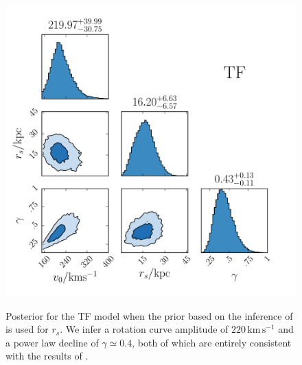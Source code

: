 \documentclass[useAMS,twocolumn,usenatbib]{mn2e}
\def\kms{{\,\mathrm{km\,s^{-1}}}}
\begin{document}
\begin{figure}
\includegraphics[width=\columnwidth]{plots/corner_TF}\\
\caption{Posterior for the TF model when the prior based on the inference of \citet{Gi14} is used for $r_s$. 
We infer a rotation curve amplitude of $220\kms$ and a power law decline of $\gamma \simeq 0.4$, both of which are entirely consistent with the results of \citet{Gi14}.}
\label{fig:TF_posterior}
\end{figure}

\end{document}
